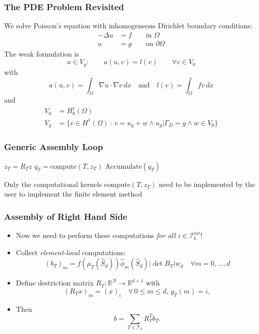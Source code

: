 \documentclass[aspectratio=169,11pt]{beamer}
\theoremstyle{definition}
\begin{document}
\begin{frame}
\frametitle{The PDE Problem Revisited}
We solve Poisson's equation with inhomogeneous Dirichlet boundary conditions:
\begin{align*}
-\Delta u & = f \qquad\text{in $\Omega$}\\
u &= g \qquad\text{on $\partial\Omega$}
\end{align*}
The weak formulation is
\begin{equation*}
u \in V_g :\qquad a(u,v) = l(v) \qquad \forall v\in V_0
\end{equation*}
with
$$a(u,v) = \int_\Omega \nabla u \cdot \nabla v \,dx  \quad\text{and}\quad
l(v)=\int_\Omega fv\, dx $$
and
\begin{align*}
V_0 &= H_0^1(\Omega) \\
V_g &= \{ v\in H^1(\Omega) \,:\, v = u_g + w \wedge u_g|\Gamma_D=g \wedge w\in V_0 \}
\end{align*}
\end{frame}

\begin{frame}
\frametitle{Generic Assembly Loop}
\begin{algorithmic}[1]
 
\State $z_T = R_T z$ 
\State $q_T=\text{compute}(T,z_T)$ 
\State $\text{Accumulate}(q_T)$ 
\EndFor
\end{algorithmic}
Only the computational kernels $\text{compute}(T,z_T)$ need to be implemented by the user
to implement the finite element method
\end{frame}

\begin{frame}
\frametitle{Assembly of Right Hand Side}
\begin{itemize}
\item Now we need to perform these computations {\em for all $i\in\mathcal{I}_h^{int}$}!
\item Collect {\em element-local} computations:
\begin{equation*}
(b_T)_m =  f(\mu_T(\hat S_d)) \hat\phi_m(\hat S_d) |\det B_T| w_d \quad \forall m=0,\ldots,d
\end{equation*}
\item Define {destriction matrix} $R_T : \mathbb{R}^N \to \mathbb{R}^{d+1}$ with
\begin{equation*}
(R_T x)_m = (x)_i \quad \forall \,0\leq m \leq d, \,g_T(m)=i,
\end{equation*}
\item Then
\begin{equation*}
b = \sum_{T\in\mathcal{T}_h} R_T^T b_T .
\end{equation*}
\end{itemize}
\end{frame}
\end{document}
